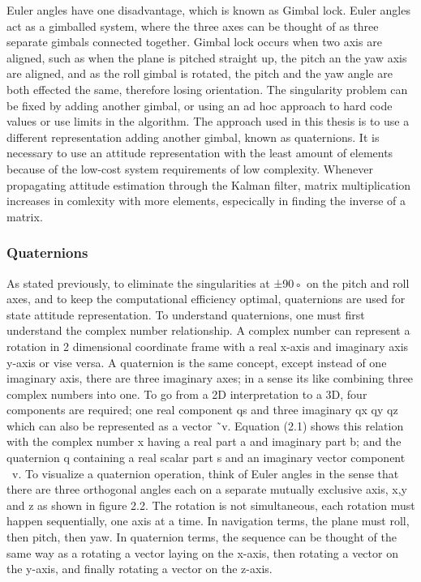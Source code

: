 Euler angles have one disadvantage, which is known as Gimbal lock. Euler angles act
as a gimballed system, where the three axes can be thought of as three separate gimbals
connected together. Gimbal lock occurs when two axis are aligned, such as when the plane
is pitched straight up, the pitch an the yaw axis are aligned, and as the roll gimbal is rotated,
the pitch and the yaw angle are both effected the same, therefore losing orientation. The
singularity problem can be fixed by adding another gimbal, or using an ad hoc approach to
hard code values or use limits in the algorithm. The approach used in this thesis is to use a
different representation adding another gimbal, known as quaternions. It is necessary to use
an attitude representation with the least amount of elements because of the low-cost system
requirements of low complexity. Whenever propagating attitude estimation through the
Kalman filter, matrix multiplication increases in comlexity with more elements, especically
in finding the inverse of a matrix.
\subsubsection{Quaternions}
As stated previously, to eliminate the singularities at ±90◦ on the pitch and roll axes, and
to keep the computational efficiency optimal, quaternions are used for state attitude representation. To understand quaternions, one must first understand the complex number
relationship. A complex number can represent a rotation in 2 dimensional coordinate frame
with a real x-axis and imaginary axis y-axis or vise versa.
A quaternion is the same concept, except instead of one imaginary axis, there are three
imaginary axes; in a sense its like combining three complex numbers into one. To go from a
2D interpretation to a 3D, four components are required; one real component qs and three
imaginary qx qy qz which can also be represented as a vector ˜v. Equation (2.1) shows this
relation with the complex number x having a real part a and imaginary part b; and the
quaternion q containing a real scalar part s and an imaginary vector component ~v.
To visualize a quaternion operation, think of Euler angles in the sense that there are
three orthogonal angles each on a separate mutually exclusive axis, x,y and z as shown in
figure 2.2. The rotation is not simultaneous, each rotation must happen sequentially, one
axis at a time. In navigation terms, the plane must roll, then pitch, then yaw. In quaternion
terms, the sequence can be thought of the same way as a rotating a vector laying on the
x-axis, then rotating a vector on the y-axis, and finally rotating a vector on the z-axis.

